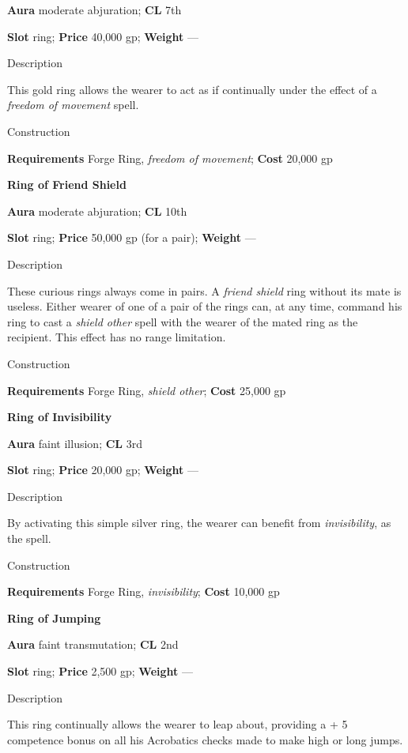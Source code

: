 \textbf{Aura} moderate abjuration;\textbf{ CL }7th
				
\textbf{Slot} ring; \textbf{Price} 40,000 gp; \textbf{Weight} ---
				
Description
				
This gold ring allows the wearer to act as if continually under the effect of a \textit{freedom of movement }spell. 
				
Construction
				
\textbf{Requirements} Forge Ring, \textit{freedom of movement}; \textbf{Cost }20,000 gp
				
\textbf{Ring of Friend Shield}
				
\textbf{Aura} moderate abjuration;\textbf{ CL }10th
				
\textbf{Slot} ring; \textbf{Price} 50,000 gp (for a pair); \textbf{Weight} ---
				
Description
				
These curious rings always come in pairs. A \textit{friend shield }ring without its mate is useless. Either wearer of one of a pair of the rings 
can, at any time, command
 his ring to cast a \textit{shield other }spell with the wearer of the mated ring as the recipient. This effect has no range limitation. 
				
Construction
				
\textbf{Requirements} Forge Ring, \textit{shield other}; \textbf{Cost }25,000 gp
				
\textbf{Ring of Invisibility}
				
\textbf{Aura} faint illusion;\textbf{ CL }3rd
				
\textbf{Slot} ring; \textbf{Price} 20,000 gp; \textbf{Weight} ---
				
Description
				
By activating this simple silver ring, the wearer can benefit from \textit{invisibility}, as the spell. 
				
Construction
				
\textbf{Requirements} Forge Ring, \textit{invisibility}; \textbf{Cost }10,000 gp
				
\textbf{Ring of Jumping}
				
\textbf{Aura} faint transmutation;\textbf{ CL }2nd
				
\textbf{Slot} ring; \textbf{Price} 2,500 gp; \textbf{Weight} ---
				
Description
				
This ring continually allows the wearer to leap about, providing a +
5 competence
 bonus on all his Acrobatics checks made to make high or long jumps. 
				
